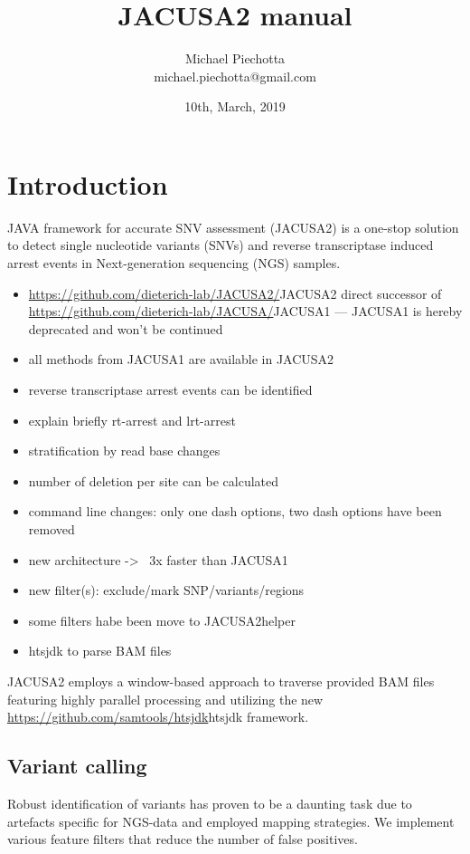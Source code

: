 \documentclass[10pt,a4paper,draft]{article}
\title{JACUSA2 manual}
\author{Michael Piechotta \\ michael.piechotta@gmail.com}
\date{10th, March, 2019}
\begin{document}
\maketitle 
\tableofcontents
\listoftodos
\section{Introduction}
JAVA framework for accurate SNV assessment (JACUSA2) is a one-stop solution to detect single
nucleotide variants (SNVs) and reverse transcriptase induced arrest events in Next-generation 
sequencing (NGS) samples. 
\begin{itemize}
  \item \url{https://github.com/dieterich-lab/JACUSA2/}{JACUSA2} direct successor of 
  \url{https://github.com/dieterich-lab/JACUSA/}{JACUSA1} --- JACUSA1 is hereby deprecated and won't be continued
  \item all methods from JACUSA1 are available in JACUSA2
  \item reverse transcriptase arrest events can be identified
  \item explain briefly rt-arrest and lrt-arrest
  \item stratification by read base changes
  \item number of deletion per site can be calculated 
  \item command line changes: only one dash options, two dash options have been removed
  \item new architecture -> ~3x faster than JACUSA1
  \item new filter(s): exclude/mark SNP/variants/regions
  \item some filters habe been move to JACUSA2helper
  \item htsjdk to parse BAM files
\end{itemize}

JACUSA2 employs a window-based approach to traverse provided BAM files featuring highly parallel 
processing and utilizing the new \url{https://github.com/samtools/htsjdk}{htsjdk} framework.

\subsection{Variant calling}
Robust identification of variants has proven to be a daunting task due to artefacts specific 
for NGS-data and employed mapping strategies. 
We implement various feature filters that reduce the number of false positives. 
\end{document}
